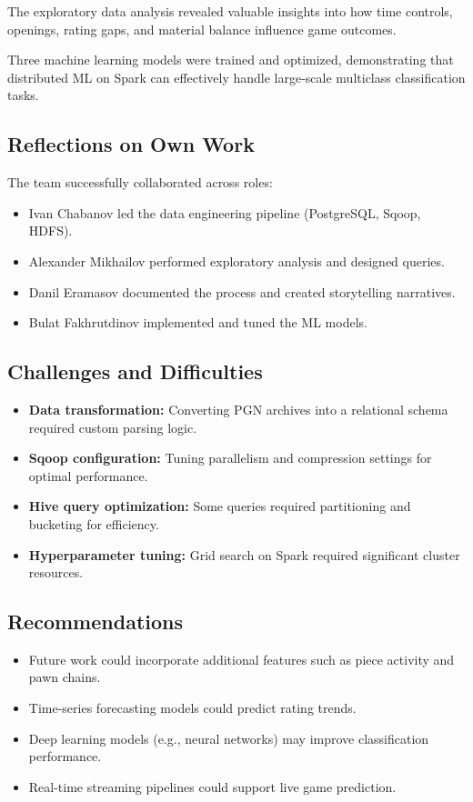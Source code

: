 \documentclass[12pt,a4paper]{article}
\begin{document}
The exploratory data analysis revealed valuable insights into how time controls, openings, rating gaps, and material balance influence game outcomes.

Three machine learning models were trained and optimized, demonstrating that distributed ML on Spark can effectively handle large-scale multiclass classification tasks.

\subsection{Reflections on Own Work}

The team successfully collaborated across roles:

\begin{itemize}
    \item Ivan Chabanov led the data engineering pipeline (PostgreSQL, Sqoop, HDFS).
    \item Alexander Mikhailov performed exploratory analysis and designed queries.
    \item Danil Eramasov documented the process and created storytelling narratives.
    \item Bulat Fakhrutdinov implemented and tuned the ML models.
\end{itemize}

\subsection{Challenges and Difficulties}

\begin{itemize}
    \item \textbf{Data transformation:} Converting PGN archives into a relational schema required custom parsing logic.
    \item \textbf{Sqoop configuration:} Tuning parallelism and compression settings for optimal performance.
    \item \textbf{Hive query optimization:} Some queries required partitioning and bucketing for efficiency.
    \item \textbf{Hyperparameter tuning:} Grid search on Spark required significant cluster resources.
\end{itemize}

\subsection{Recommendations}

\begin{itemize}
    \item Future work could incorporate additional features such as piece activity and pawn chains.
    \item Time-series forecasting models could predict rating trends.
    \item Deep learning models (e.g., neural networks) may improve classification performance.
    \item Real-time streaming pipelines could support live game prediction.
\end{itemize}
\end{document}
